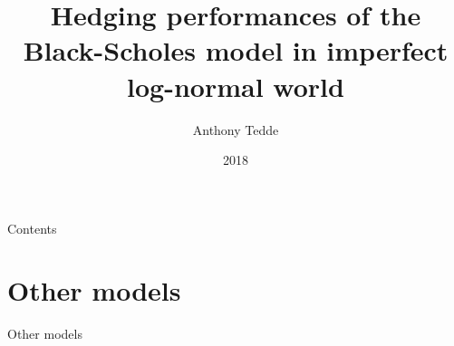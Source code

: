 \documentclass{beamer}
\title{Hedging performances of the Black-Scholes model in imperfect log-normal world}
\author{Anthony Tedde}
\institute{Louvain School of Management (LSM)}
\date{2018}
\begin{document}

 
\frame{\titlepage}
\section[]{}
\begin{frame}{Contents}
  \tableofcontents
\end{frame}








\section{Other models}


\begin{frame}{Other models}

\tableofcontents[currentsection]
 
\end{frame}
\end{document}
